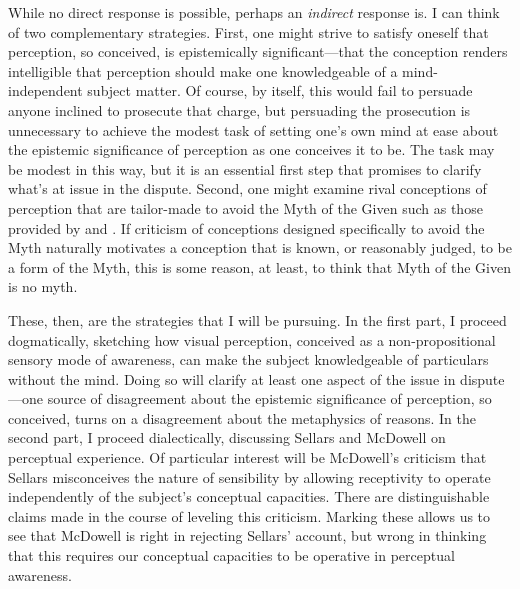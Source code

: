 \documentclass[12pt]{article}
\begin{document}
While no direct response is possible, perhaps an \emph{indirect} response is. I can think of two complementary strategies. First, one might strive to satisfy oneself that perception, so conceived, is epistemically significant---that the conception renders intelligible that perception should make one knowledgeable of a mind-independent subject matter. Of course, by itself, this would fail to persuade anyone inclined to prosecute that charge, but persuading the prosecution is unnecessary to achieve the modest task of setting one's own mind at ease about the epistemic significance of perception as one conceives it to be. The task may be modest in this way, but it is an essential first step that promises to clarify what's at issue in the dispute. Second, one might examine rival conceptions of perception that are tailor-made to avoid the Myth of the Given such as those provided by \citet{Sellars:1956xp} and \citet{McDowell:1996uq,McDowell:1998vn,McDowell:2008fk}. If criticism of conceptions designed specifically to avoid the Myth naturally motivates a conception that is known, or reasonably judged, to be a form of the Myth, this is some reason, at least, to think that Myth of the Given is no myth. 

These, then, are the strategies that I will be pursuing. In the first part, I proceed dogmatically, sketching how visual perception, conceived as a non-propositional sensory mode of awareness, can make the subject knowledgeable of particulars without the mind. Doing so will clarify at least one aspect of the issue in dispute---one source of disagreement about the epistemic significance of perception, so conceived, turns on a disagreement about the metaphysics of reasons. In the second part, I proceed dialectically, discussing Sellars and McDowell on perceptual experience. Of particular interest will be McDowell's criticism that Sellars misconceives the nature of sensibility by allowing receptivity to operate independently of the subject's conceptual capacities. There are distinguishable claims made in the course of leveling this criticism. Marking these allows us to see that McDowell is right in rejecting Sellars' account, but wrong in thinking that this requires our conceptual capacities to be operative in perceptual awareness. %

\end{document}
